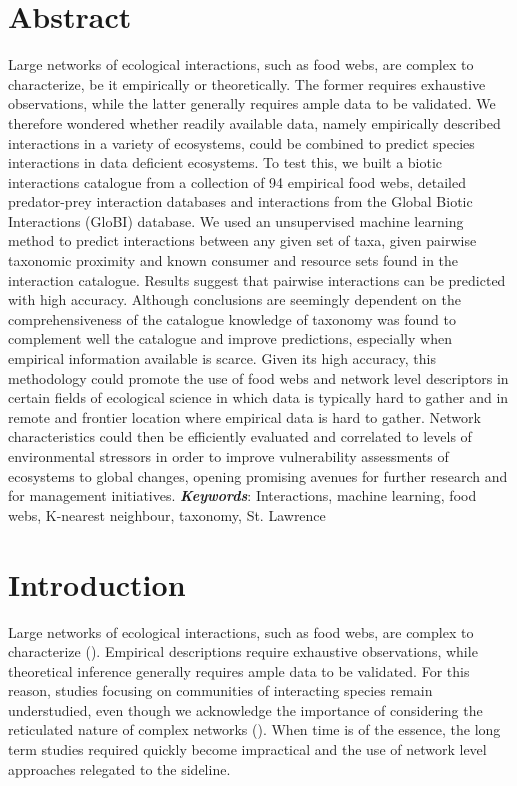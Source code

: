 \section{Abstract}
Large networks of ecological interactions, such as food webs, are complex to characterize, be it empirically or theoretically. The former requires exhaustive observations, while the latter generally requires ample data to be validated. We therefore wondered whether readily available data, namely empirically described interactions in a variety of ecosystems, could be combined to predict species interactions in data deficient ecosystems. To test this, we built a biotic interactions catalogue from a collection of 94 empirical food webs, detailed predator-prey interaction databases and interactions from the Global Biotic Interactions (GloBI) database. We used an unsupervised machine learning method to predict interactions between any given set of taxa, given pairwise taxonomic proximity and known consumer and resource sets found in the interaction catalogue. Results suggest that pairwise interactions can be predicted with high accuracy. Although conclusions are seemingly dependent on the comprehensiveness of the catalogue knowledge of taxonomy was found to complement well the catalogue and improve predictions, especially when empirical information available is scarce. Given its high accuracy, this methodology could promote the use of food webs and network level descriptors in certain fields of ecological science in which data is typically hard to gather and in remote and frontier location where empirical data is hard to gather. Network characteristics could then be efficiently evaluated and correlated to levels of environmental stressors in order to improve vulnerability assessments of ecosystems to global changes, opening promising avenues for further research and for management initiatives.
\newline
\textbf{\textit{Keywords}}: Interactions, machine learning, food webs, K-nearest neighbour, taxonomy, St. Lawrence

\section{Introduction}
Large networks of ecological interactions, such as food webs, are complex to characterize (\cite{polis1991, martinez1992, pascual2006}). Empirical descriptions require exhaustive observations, while theoretical inference generally requires ample data to be validated. For this reason, studies focusing on communities of interacting species remain understudied, even though we acknowledge the importance of considering the reticulated nature of complex networks (\cite{ings2009, tylianakis2008}). When time is of the essence, the long term studies required quickly become impractical and the use of network level approaches relegated to the sideline.

